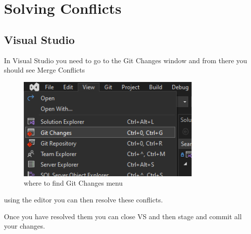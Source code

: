 \chapter{Solving Conflicts}
\chapteroverlay
\section{Visual Studio}
In Visual Studio you need to go to the Git Changes window and from there you should see Merge Conflicts
\begin{figure}[H]
    \centering
    \includegraphics[width=0.8\textwidth]{Images/view_git}
    \caption{where to find Git Changes menu}
\end{figure}

using the editor you can then resolve these conflicts.

Once you have resolved them you can close VS and then stage and commit all your changes.
